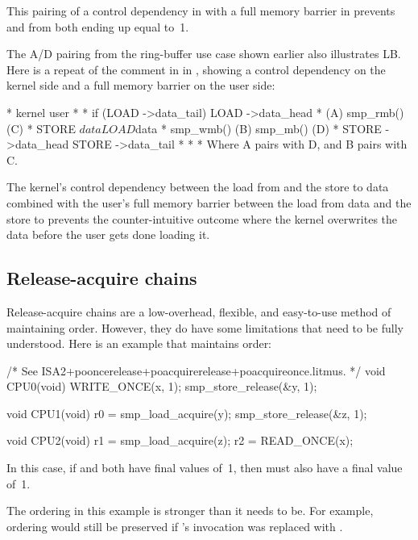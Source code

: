 This pairing of a control dependency in  with a full memory
barrier in  prevents  and  from both ending up
equal to~1.

The A/D pairing from the ring-buffer use case shown earlier also
illustrates LB.  Here is a repeat of the comment in
 in ,
showing a control dependency on the kernel side and a full memory barrier on
the user side:

\begin{VerbatimU}
	 *   kernel                             user
	 *
	 *   if (LOAD ->data_tail) {            LOAD ->data_head
	 *                      (A)             smp_rmb()       (C)
	 *      STORE $data                     LOAD $data
	 *      smp_wmb()       (B)             smp_mb()        (D)
	 *      STORE ->data_head               STORE ->data_tail
	 *   }
	 *
	 * Where A pairs with D, and B pairs with C.
\end{VerbatimU}

The kernel's control dependency between the load from 
and the store to data combined with the user's full memory barrier
between the load from data and the store to  prevents
the counter-intuitive outcome where the kernel overwrites the data
before the user gets done loading it.


\subsection{Release-acquire chains}

Release-acquire chains are a low-overhead, flexible, and easy-to-use
method of maintaining order.
However, they do have some limitations that need to be fully understood.
Here is an example that maintains order:

\begin{VerbatimU}
	/* See ISA2+pooncerelease+poacquirerelease+poacquireonce.litmus. */
	void CPU0(void)
	{
		WRITE_ONCE(x, 1);
		smp_store_release(&y, 1);
	}

	void CPU1(void)
	{
		r0 = smp_load_acquire(y);
		smp_store_release(&z, 1);
	}

	void CPU2(void)
	{
		r1 = smp_load_acquire(z);
		r2 = READ_ONCE(x);
	}
\end{VerbatimU}

In this case, if  and  both have final values of~1, then 
must also have a final value of~1.

The ordering in this example is stronger than it needs to be.
For example, ordering would still be preserved if 's
 invocation was replaced with .

